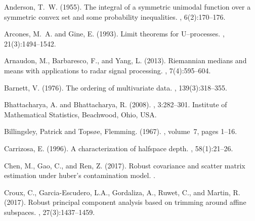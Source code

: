\documentclass[a4paper]{article}
\numberwithin{equation}{section}
\begin{document}
\begin{thebibliography}{99}

Anderson, T.~W. (1955).
\newblock The integral of a symmetric unimodal function over a symmetric convex
  set and some probability inequalities.
,
  6(2):170--176.

Arcones, M.~A. and Gine, E. (1993).
\newblock Limit theorems for U--processes.
, 21(3):1494--1542.

Arnaudon, M., Barbaresco, F., and Yang, L. (2013).
\newblock Riemannian medians and means with applications to radar signal
  processing.
,
  7(4):595--604.

Barnett, V. (1976).
\newblock The ordering of multivariate data.
,
  139(3):318--355.

Bhattacharya, A. and Bhattacharya, R. (2008).
, 3:282--301.
\newblock Institute of Mathematical Statistics, Beachwood, Ohio, USA.



Billingsley, Patrick and Tops{\o}e, Flemming. (1967).
, volume~7, pages 1--16.

Carrizosa, E. (1996).
\newblock A characterization of halfspace depth.
, 58(1):21--26.

Chen, M., Gao, C., and Ren, Z. (2017).
\newblock Robust covariance and scatter matrix estimation under huber's
  contamination model.
.

Croux, C., Garcia-Escudero, L.A., Gordaliza, A., Ruwet, C., and Martin, R.
  (2017).
\newblock Robust principal component analysis based on trimming around affine
  subspaces.
, 27(3):1437--1459.


\end{thebibliography}
\end{document}

